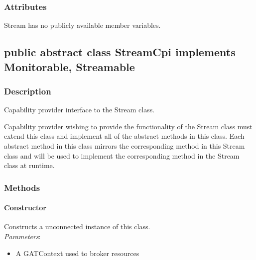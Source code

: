\documentclass[$Date: 2003/06/26 19:29:31 $]{glabarticle}
\begin{document}

\subsubsection{Attributes}

Stream has no publicly available member variables. 


\newpage

\subsection{public abstract class StreamCpi implements Monitorable, Streamable}


\subsubsection{Description}

Capability provider interface to the Stream class.

Capability provider wishing to provide the functionality of the Stream class must extend 
this class and implement all of the abstract methods in this class. Each abstract method in this class 
mirrors the corresponding method in this Stream class and will be used to implement 
the corresponding method in the Stream class at runtime. 


\subsubsection{Methods}

\paragraph{Constructor}

Constructs a unconnected instance of this class. \\

\textit{Parameters}:
\begin{itemize}
\item[] A GATContext used to broker resources
\end{itemize}
\end{document}
